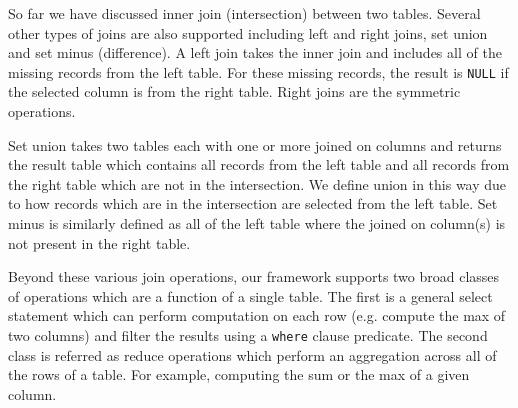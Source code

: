 So far we have discussed inner join (intersection) between two tables. Several other types of joins are also supported including left and right joins, set union and set minus (difference). A left join takes the inner join and includes all of the missing records from the left table. For these missing records, the result is \texttt{NULL} if the selected column is from the right table. Right joins are the symmetric operations. 

Set union takes two tables each with one or more joined on columns and returns the result table which contains all records from the left table and all records from the right table which are not in the intersection. We define union in this way due to how records which are in the intersection are selected from the left table. Set minus is similarly defined as all of the left table where the joined on column(s) is not present in the right table. 

Beyond these various join operations, our framework supports two broad classes of operations which are a function of a single table. The first is a general select statement which can perform computation on each row (e.g. compute the max of two columns) and filter the results using a \texttt{where} clause predicate. The second class is referred as reduce operations which perform an aggregation across all of the rows of a table. For example, computing the sum or the max of a given column. 